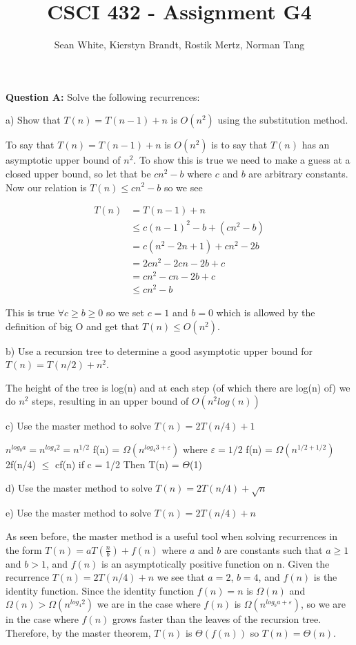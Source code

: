 \documentclass[12pt]{article}
\author{Sean White, Kierstyn Brandt, Rostik Mertz, Norman Tang}
\title{CSCI 432 - Assignment G4}
\begin{document}
\maketitle

\noindent
\textbf{Question A:} Solve the following recurrences: \smallskip

a) Show that $T(n) = T(n - 1) + n$ is $O(n^2)$ using the substitution method.\smallskip

To say that $T(n) = T(n - 1) + n$ is $O(n^2)$ is to say that $T(n)$ has an asymptotic upper bound of $n^2$. To show this is true we need to make a guess at a closed upper bound, so let that be $cn^2 - b$ where $c$ and $b$ are arbitrary constants. Now our relation is $T(n) \leq cn^2 -b$ so we see

\begin{align*}
T(n) &= T(n - 1) + n\\
&\leq c(n-1)^2 - b + (cn^2 - b)\\
&= c(n^2 - 2n + 1) + cn^2 -2b\\
&= 2cn^2 - 2cn - 2b + c\\
&= cn^2 - cn - 2b + c\\
&\leq cn^2 - b
\end{align*}

This is true $\forall c \geq b \geq 0$ so we set $c = 1$ and $b = 0$ which is allowed by the definition of big O and get that $T(n) \leq O(n^2)$.
\bigskip

b) Use a recursion tree to determine a good asymptotic upper bound for $T(n) = T(n/2) + n^2$. \smallskip

The height of the tree is log(n) and at each step (of which there are log(n) of) we do $n^2$ steps, resulting in an upper bound of $O(n^2log(n))$ \bigskip

c) Use the master method to solve $T(n) = 2T(n/4) + 1$ \smallskip

 $n^{log_b a} = n^{log_4 2} = n^{1/2}$
 f(n) = $\Omega (n^{log_4 3 + \varepsilon})$ where $\varepsilon = 1/2$
 f(n) = $\Omega (n^{1/2 + 1/2})$ 
 2f(n/4) $\leq$ cf(n) if c = 1/2 
 Then T(n) = $\Theta$(1)
 \bigskip
 
d) Use the master method to solve $T(n) = 2T(n/4) + \sqrt{n}$ \smallskip

e) Use the master method to solve $T(n) = 2T(n/4) + n$ \smallskip

As seen before, the master method is a useful tool when solving recurrences in the form $T(n) = aT(\frac{n}{b}) + f(n)$ where $a$ and $b$ are constants such that $a \geq 1$ and $b > 1$, and $f(n)$ is an asymptotically positive function on n. Given the recurrence $T(n) = 2T(n/4) + n$ we see that $a = 2$, $b = 4$, and $f(n)$ is the identity function. Since the identity function $f(n) = n$ is $\Omega (n)$ and $\Omega (n) > \Omega (n^{log_4 2})$ we are in the case where $f(n)$ is $\Omega (n^{log_b a + \varepsilon})$, so we are in the case where $f(n)$ grows faster than the leaves of the recursion tree. Therefore, by the master theorem, $T(n)$ is $\Theta (f(n))$ so $T(n) = \Theta (n)$. \bigskip
\end{document}
